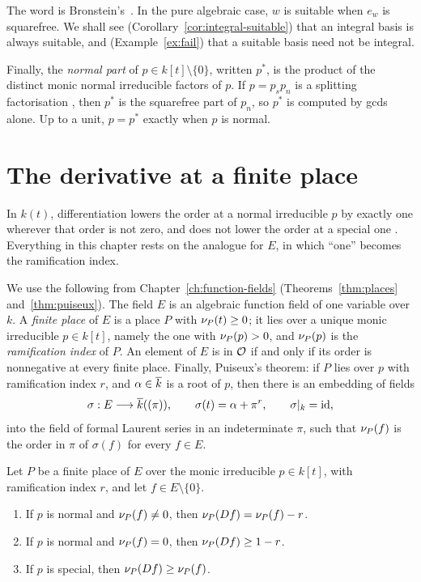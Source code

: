 The word is Bronstein's~\cite[\S3]{bronstein1998lazy}. In the pure algebraic
case, $w$ is suitable when $e_w$ is squarefree. We shall see
(Corollary~\ref{cor:integral-suitable}) that an integral basis is always
suitable, and (Example~\ref{ex:fail}) that a suitable basis need not be
integral.

Finally, the \emph{normal part} of $p \in k[t] \setminus \{0\}$, written $p^*$,
is the product of the distinct monic normal irreducible factors of $p$. If
$p = p_s p_n$ is a splitting factorisation , then $p^*$
is the squarefree part of $p_n$, so $p^*$ is computed by gcds alone. Up to a
unit, $p = p^*$ exactly when $p$ is normal.

\section{The derivative at a finite place}\label{sec:hermite-order}

In $k(t)$, differentiation lowers the order at a normal irreducible $p$ by
exactly one wherever that order is not zero, and does not lower the order at a
special one . Everything in this chapter rests on the
analogue for $E$, in which ``one'' becomes the ramification index.

We use the following from Chapter~\ref{ch:function-fields}
(Theorems~\ref{thm:places} and~\ref{thm:puiseux}). The field $E$ is
an algebraic function field of one variable over $k$. A \emph{finite place}
of $E$ is a place $P$ with $\nu_{P}(t) \ge 0$; it lies over a unique monic
irreducible $p \in k[t]$, namely the one with $\nu_{P}(p) > 0$, and
$\nu_{P}(p)$ is the \emph{ramification index} of $P$. An element of $E$ is in
$\mathcal{O}$ if and only if its order is nonnegative at every finite place. Finally,
Puiseux's theorem: if $P$ lies over $p$ with ramification index $r$, and
$\alpha \in \overline{k}$ is a root of $p$, then there is an embedding of fields
\begin{equation}\label{eq:puiseux}
  \sigma : E \longrightarrow \overline{k}((\pi)), \qquad
  \sigma(t) = \alpha + \pi^r, \qquad \sigma|_k = \mathrm{id},
\end{equation}
into the field of formal Laurent series in an indeterminate $\pi$, such that
$\nu_{P}(f)$ is the order in $\pi$ of $\sigma(f)$ for every $f \in E$.

\begin{lemma}\label{lem:order-derivative}
Let $P$ be a finite place of $E$ over the monic irreducible $p \in k[t]$, with
ramification index $r$, and let $f \in E \setminus \{0\}$.
\begin{enumerate}[label=\textup{(\roman*)}]
\item If $p$ is normal and $\nu_{P}(f) \ne 0$, then $\nu_{P}(Df) = \nu_{P}(f) - r$.
\item If $p$ is normal and $\nu_{P}(f) = 0$, then $\nu_{P}(Df) \ge 1 - r$.
\item If $p$ is special, then $\nu_{P}(Df) \ge \nu_{P}(f)$.
\end{enumerate}
\end{lemma}

